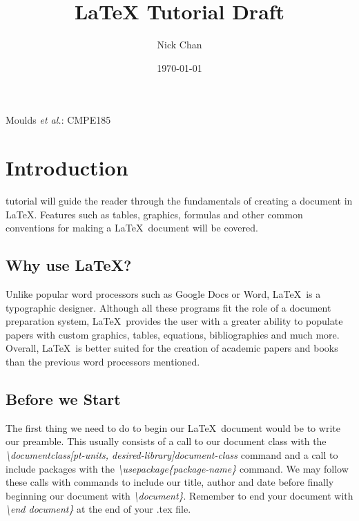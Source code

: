 \documentclass[12pt,journal,compsoc]{IEEEtran}
\title{LaTeX Tutorial Draft}
\author{Nick Chan}
\date{\today}
\begin{document}
%
{Moulds \MakeLowercase{\textit{et al.}}: CMPE185}



\maketitle

\section{Introduction}
 tutorial will guide the reader through the fundamentals of creating a document in \LaTeX\/. Features such as tables, graphics, formulas and other common conventions for making a \LaTeX\ document will be covered.
\subsection*{Why use \LaTeX\/?}
Unlike popular word processors such as Google Docs or Word, \LaTeX\ is a typographic designer. Although all these programs fit the role of a document preparation system, \LaTeX\ provides the user with a greater ability to populate papers with custom graphics, tables, equations, bibliographies and much more. Overall, \LaTeX\ is better suited for the creation of academic papers and books than the previous word processors mentioned.

\subsection*{Before we Start}
The first thing we need to do to begin our \LaTeX\ document would be to write our preamble. This usually consists of a call to our document class with the \emph{\textbackslash documentclass[pt-units, desired-library]{document-class}} command and a call to include packages with the \emph{\textbackslash usepackage\{package-name\}} command. We may follow these calls with commands to include our title, author and date before finally beginning our document with \emph{\textbackslash document\}}. Remember to end your document with \emph{\textbackslash end document\}} at the end of your .tex file.
\end{document}
